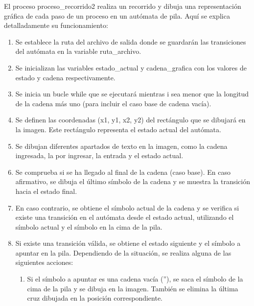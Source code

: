 \begin{enumerate}
El proceso proceso\_recorrido2 realiza un recorrido y dibuja una representación gráfica de cada paso de un proceso en un autómata de pila. Aquí se explica detalladamente su funcionamiento:\newline
\begin{enumerate}
    \item Se establece la ruta del archivo de salida donde se guardarán las transiciones del autómata en la variable ruta\_archivo.\newline
    \item Se inicializan las variables estado\_actual y cadena\_grafica con los valores de estado y cadena respectivamente.\newline
    \item Se inicia un bucle while que se ejecutará mientras i sea menor que la longitud de la cadena más uno (para incluir el caso base de cadena vacía).\newline
    \item Se definen las coordenadas (x1, y1, x2, y2) del rectángulo que se dibujará en la imagen. Este rectángulo representa el estado actual del autómata.\newline
    \item Se dibujan diferentes apartados de texto en la imagen, como la cadena ingresada, la por ingresar, la entrada y el estado actual.\newline
    \item Se comprueba si se ha llegado al final de la cadena (caso base). En caso afirmativo, se dibuja el último símbolo de la cadena y se muestra la transición hacia el estado final.\newline
    \item En caso contrario, se obtiene el símbolo actual de la cadena y se verifica si existe una transición en el autómata desde el estado actual, utilizando el símbolo actual y el símbolo en la cima de la pila.\newline
    \item Si existe una transición válida, se obtiene el estado siguiente y el símbolo a apuntar en la pila. Dependiendo de la situación, se realiza alguna de las siguientes acciones:\newline
    \begin{enumerate}
        \item Si el símbolo a apuntar es una cadena vacía (''), se saca el símbolo de la cima de la pila y se dibuja en la imagen. También se elimina la última cruz dibujada en la posición correspondiente.\newline

\end{enumerate}
\end{enumerate}
\end{enumerate}
